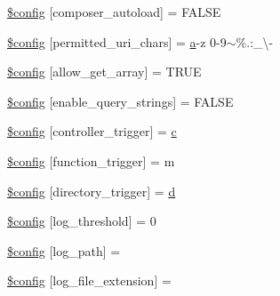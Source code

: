 \begin{DoxyCompactItemize}
\item 
\hyperlink{application_2config_2config_8php_ac8ab0111ebe9c372fb22c673ed923f0d}{\$config} \mbox{[}\textquotesingle{}composer\+\_\+autoload\textquotesingle{}\mbox{]} = F\+A\+L\+S\+E
\item 
\hyperlink{application_2config_2config_8php_ae2e36375b245287a8851ac04565994de}{\$config} \mbox{[}\textquotesingle{}permitted\+\_\+uri\+\_\+chars\textquotesingle{}\mbox{]} = \textquotesingle{}\hyperlink{bootstrap_8min_8js_a1f5870dcf487187f13d5fd328ed9e6e7}{a}-\/z 0-\/9$\sim$\%.\+:\+\_\+\textbackslash{}-\/\textquotesingle{}
\item 
\hyperlink{application_2config_2config_8php_ac714a2702b430e47833d82d6ee590298}{\$config} \mbox{[}\textquotesingle{}allow\+\_\+get\+\_\+array\textquotesingle{}\mbox{]} = T\+R\+U\+E
\item 
\hyperlink{application_2config_2config_8php_a227b7a6fec0306454ffb0dead1f1c4f7}{\$config} \mbox{[}\textquotesingle{}enable\+\_\+query\+\_\+strings\textquotesingle{}\mbox{]} = F\+A\+L\+S\+E
\item 
\hyperlink{application_2config_2config_8php_a7ea9e139536f27af75812de53e852829}{\$config} \mbox{[}\textquotesingle{}controller\+\_\+trigger\textquotesingle{}\mbox{]} = \textquotesingle{}\hyperlink{jquery_8canvasjs_8min_8js_ad9d1ac02e33c4aed62ad517a7cb8b3fb}{c}\textquotesingle{}
\item 
\hyperlink{application_2config_2config_8php_acac6a7410b2ae72152894e3b93501811}{\$config} \mbox{[}\textquotesingle{}function\+\_\+trigger\textquotesingle{}\mbox{]} = \textquotesingle{}m\textquotesingle{}
\item 
\hyperlink{application_2config_2config_8php_af7e6593d4088b77d153dafff4567f143}{\$config} \mbox{[}\textquotesingle{}directory\+\_\+trigger\textquotesingle{}\mbox{]} = \textquotesingle{}\hyperlink{jquery_8canvasjs_8min_8js_a36541169dfff685f807208881a4f0021}{d}\textquotesingle{}
\item 
\hyperlink{application_2config_2config_8php_a7e7fe9a5aa2c85e48865b154035dab6a}{\$config} \mbox{[}\textquotesingle{}log\+\_\+threshold\textquotesingle{}\mbox{]} = 0
\item 
\hyperlink{application_2config_2config_8php_aee8524f2388d21b1c73de5c48a82b687}{\$config} \mbox{[}\textquotesingle{}log\+\_\+path\textquotesingle{}\mbox{]} = \textquotesingle{}\textquotesingle{}
\item 
\hyperlink{application_2config_2config_8php_a393732deb535f26741ab9dcec545be0d}{\$config} \mbox{[}\textquotesingle{}log\+\_\+file\+\_\+extension\textquotesingle{}\mbox{]} = \textquotesingle{}\textquotesingle{}

\end{DoxyCompactItemize}
